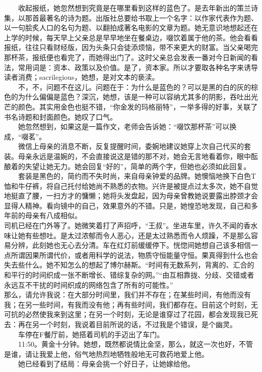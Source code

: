 \documentclass[letterpaper, 12pt]{article}
\begin{document}
\begin{multicols}{2}
　　收起报纸，她忽然想到究竟是在哪里看到这样的蓝色了。是去年新出的策兰诗集，以那首最著名的诗为题。出版社总要给书取上一个名字：以作家代表作为题、以一句脍炙人口的名句为题、以翻拍成著名电影的文章为题。她无意识地想起还在上学的时候，每天早上父亲总是早早地坐在餐桌边，啜饮着属于他的茶。他会看看报纸，往往只看财经版，因为头条只会徒添烦恼，带不来更大的财富。当父亲喝完那杯茶，报纸便也看完了，而她得出门了。这时父亲总会发表一番对今日新闻的看法，常用词是：资本、政策以及价值。是了，资本家。所以才要取各种名字来诱导读者消费；sacrilegious，她想，是对文本的亵渎。\\
  
　　不，不，问题不在这儿。问题在于：为什么是蓝色的？可以是黑的白的灰的棕色的为什么偏偏是蓝色？深沉，她想，该是一种可以容纳尤其多的阴影，吞吐出光芒的颜色。其实用金色也挺不错，“你金发的玛格丽特”，一举多得的好事，关联了书名诗题和封面颜色。她叹了口气。\\
  
　　她忽然想到，如果这是一篇作文，老师会告诉她：“啜饮那杯茶”可以换成，“啜茗”。\\
  
　　微信上母亲的消息不断，反复提醒时间，委婉地建议她穿上次自己代买的套装。母亲永远是温婉的，不会直接说这是错的那不对，她会无言地看着你，眼中酝酿着的失望让她无力。她会回复“好的”，简单的两个字，但她也必须如此回复。\\
  
　　套装是黑色的，简约而不失时尚，来自母亲钟爱的品牌。她懊恼地换下白色T恤和牛仔裤，将自己托付给她尚不熟悉的衣物。兴许是被提点过太多次，她不自觉地挺直了腰，一扫方才的慵懒；她将头发盘起，因为母亲曾教她说要露出脖颈才会显得人精神。看向镜中的自己，效果意外的不错。只是，她惶恐地发现，自己和多年前的母亲有八成相似。\\
  
司机已经在门外等了。她微笑着打了声招呼，“王叔”。坐进车里，许久不闻的香水味让她有些想吐。是太过浓郁而令人恶心，还是太过熟悉而令人烦躁，不是那么容易分辨，此刻她也无心去分清。车在红灯前缓缓停下。恍惚间她想自己该多相信一点所谓因果所谓代价，或者用科学的说法，物质守恒能量守恒。果真得到什么也会失去些什么。她不知怎么的想起了博尔赫斯。“时间有无数系列，背离的、汇合的和平行的时间织成一张不断增长、错综复杂的网。”“由互相靠拢、分歧、交错或者永远互不干扰的时间织成的网络包含了所有的可能性。”\\

那么，请允许我说：在大部分时间里，我们并不存在；在某些时间，有他而没有我；在另一些时间，有我而没有他；再有些时间，我们都存在。目前这个时刻，无可抗的必然使我来到这里；在另一个时刻，无论是谁穿过了花园，都会发现我已死去：再在另一个时刻，我说着目前所说的话，不过我是个错误，是个幽灵。\\

　　车停在F餐厅前，她搭着司机的手迈出了车门。\\
  
　　11:50。黄金十分钟。她想，既然都说情比金坚，那么，就这一次也好，不管是谁，请让我爱上他，俗气地热烈地牺牲般地无可救药地爱上他。\\
  
　　她已经看到了结局：母亲会挑一个好日子，让她嫁给他。

\end{multicols} 
\end{document}
